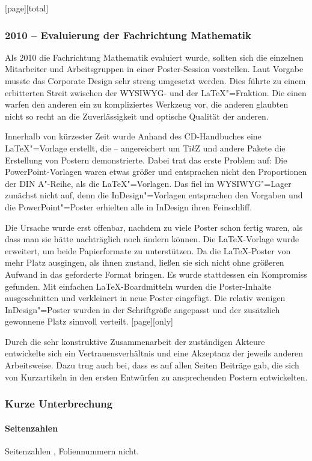 [page][total]
\begin{frame}[allowframebreaks]\frametitle{2010 – Evaluierung der Fachrichtung Mathematik}
  Als 2010 die Fachrichtung Mathematik evaluiert wurde, sollten sich
  die einzelnen Mitarbeiter und Arbeitsgruppen in einer Poster-Session
  vorstellen. Laut Vorgabe musste das Corporate Design sehr streng
  umgesetzt werden. Dies führte zu einem erbitterten Streit zwischen
  der WYSIWYG- und der \LaTeX"=Fraktion. Die einen warfen den anderen
  ein zu kompliziertes Werkzeug vor, die anderen glaubten nicht so
  recht an die Zuverlässigkeit und optische Qualität der anderen.

  Innerhalb von kürzester Zeit wurde Anhand des CD-Handbuches eine
  \LaTeX"=Vorlage erstellt, die – angereichert um Ti\emph{k}Z und
  andere Pakete die Erstellung von Postern demonstrierte. Dabei trat
  das erste Problem auf: Die PowerPoint-Vorlagen waren etwas größer
  und entsprachen nicht den Proportionen der DIN A"-Reihe, als die
  \LaTeX"=Vorlagen. Das fiel im WYSIWYG"=Lager zunächst nicht auf,
  denn die InDesign"=Vorlagen entsprachen den Vorgaben und die
  PowerPoint"=Poster erhielten alle in InDesign ihren Feinschliff.

  Die Ursache wurde erst offenbar, nachdem zu viele Poster schon
  fertig waren, als dass man sie hätte nachträglich noch ändern
  können. Die \LaTeX{}-Vorlage wurde erweitert, um beide Papierformate
  zu unterstützen. Da die \LaTeX{}-Poster von mehr Platz ausgingen,
  als ihnen zustand, ließen sie sich nicht ohne größeren Aufwand in
  das geforderte Format bringen. Es wurde stattdessen ein Kompromiss
  gefunden. Mit einfachen \LaTeX{}-Boardmitteln wurden die
  Poster-Inhalte ausgeschnitten und verkleinert in neue Poster
  eingefügt. Die relativ wenigen InDesign"=Poster wurden in der
  Schriftgröße angepasst und der zusätzlich gewonnene Platz sinnvoll
  verteilt.%
  [page][only]

  Durch die sehr konstruktive Zusammenarbeit der zuständigen Akteure
  entwickelte sich ein Vertrauensverhältnis und eine Akzeptanz der
  jeweils anderen Arbeitsweise. Dazu trug auch bei, dass es auf allen
  Seiten Beiträge gab, die sich von Kurzartikeln in den ersten
  Entwürfen zu ansprechenden Postern entwickelten.
\end{frame}
\begin{frame}\frametitle{Kurze Unterbrechung}
  \framesubtitle{Seitenzahlen}
  Seitenzahlen   , Foliennummern nicht.
\end{frame}
